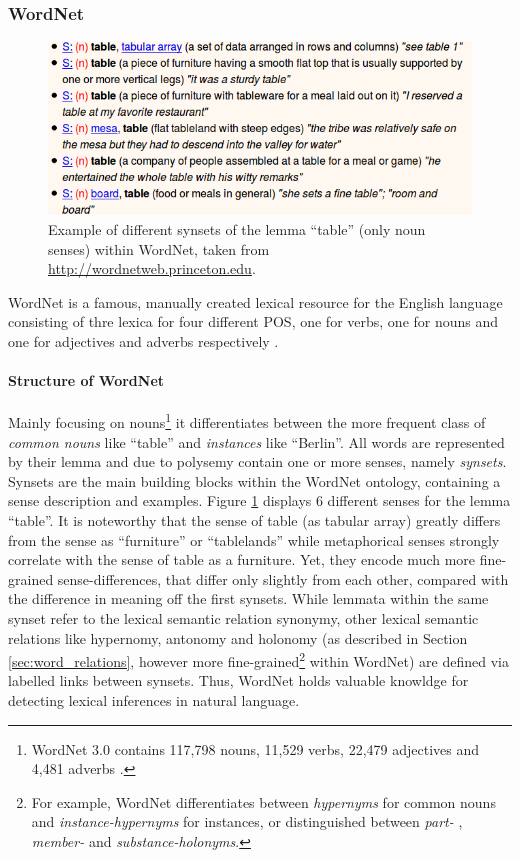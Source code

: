 \subsubsection{WordNet}\label{sec:wordnet}
\begin{figure}
\centering
	\includegraphics[totalheight=3.5cm]{fig/wordnet_example.png}
	\caption{Example of different synsets of the lemma ``table'' (only noun senses) within WordNet, taken from \href{http://wordnetweb.princeton.edu}{http://wordnetweb.princeton.edu}.}
	\label{fig:wordnet}
\end{figure}
WordNet \citep{miller1995wordnet} is a famous, manually created lexical resource for the English language consisting of thre lexica for four different \ac{POS}, one for verbs, one for nouns and one for adjectives and adverbs respectively \citep{Jurafsky2008May}. 
\paragraph*{Structure of WordNet} 
Mainly focusing on nouns\footnote{WordNet 3.0 contains 117,798 nouns, 11,529 verbs, 22,479 adjectives and 4,481 adverbs \citep{Jurafsky2008May}.} it differentiates between the more frequent class of \textit{common nouns} like ``table'' and \textit{instances} like ``Berlin''. All words are represented by their lemma and due to polysemy contain one or more senses, namely \textit{synsets}. Synsets are the main building blocks within the WordNet ontology, containing a sense description and examples. Figure \ref{fig:wordnet} displays 6 different senses for the lemma ``table''. It is noteworthy that the sense of table (as tabular array) greatly differs from the sense as ``furniture'' or ``tablelands'' while metaphorical senses strongly correlate with the sense of table as a furniture. Yet, they encode much more fine-grained sense-differences, that differ only slightly from each other, compared with the difference in meaning off the first synsets. While lemmata within the same synset refer to the lexical semantic relation synonymy, other lexical semantic relations like hypernomy, antonomy and holonomy (as described in Section \ref{sec:word_relations}, however more fine-grained\footnote{For example,  WordNet differentiates between \textit{hypernyms} for common nouns and \textit{instance-hypernyms} for instances, or distinguished between \textit{part- }, \textit{member-} and \textit{substance-holonyms}.} within WordNet) are defined via labelled links between synsets. Thus, WordNet holds valuable knowldge for detecting lexical inferences in natural language.

